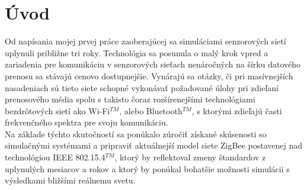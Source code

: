 \chapter{Úvod}

\indent\indent Od napísania mojej prvej práce zaoberajúcej sa simuláciami senzorových sietí~\cite{halas03} uplynuli približne tri roky. Technológia sa posunula o malý krok vpred a zariadenia pre komunikáciu v senzorových sieťach nenáročných na šírku datového prenosu sa stávajú cenovo dostupnejšie. Vynárajú sa otázky, či pri masívnejších nasadeniach sú tieto siete schopné vykonávať požadované úlohy pri zdieľaní prenosového média spolu s takisto čoraz rozšírenejšími technológiami bezdrôtových sietí ako Wi-Fi$^{TM}$, alebo Bluetooth$^{TM}$, s ktorými zdieľajú časti frekvenčného spektra pre svoju komunikáciu.\\
\indent Na základe týchto skutočností sa ponúkalo zúročiť získané skúsenosti so simulačnými systémami a pripraviť aktuálnejší model siete ZigBee postavenej nad technológiou IEEE 802.15.4$^{TM}$, ktorý by reflektoval zmeny štandardov z uplynulých mesiacov a rokov a ktorý by ponúkal bohatšie možnosti simulácii s výsledkami bližšími reálnemu svetu.